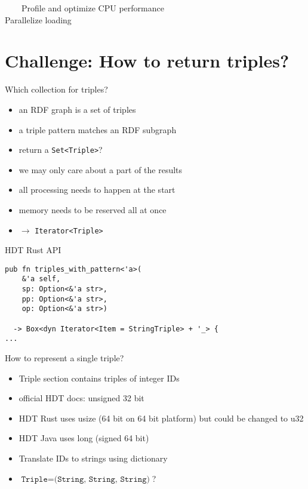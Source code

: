 \documentclass[14pt,aspectratio=169]{beamer}
\newcommand{\imageslide}[4][]
{
\begin{frame}[plain]{~~~~#2}
\vspace{0.2em}
\centering\makebox[\linewidth]{\texttt{[image: \#3]}}
\\#1
\note{#4}
\end{frame}
}
\newcommand\con{\item[$-$]}
\begin{document}
\imageslide[Parallelize loading]{Profile and optimize CPU performance}{img/parallel.png}{}

\section{Challenge: How to return triples?}

\begin{frame}{Which collection for triples?}
\begin{itemize}
\item an RDF graph is a set of triples
\item a triple pattern matches an RDF subgraph
\item return a \texttt{Set<Triple>}?
\pause
\con we may only care about a part of the results
\con all processing needs to happen at the start
\con memory needs to be reserved all at once
\item $\rightarrow$ \texttt{Iterator<Triple>}
\end{itemize}
\end{frame}

\begin{frame}[fragile]{HDT Rust API}
\small
\begin{verbatim}
pub fn triples_with_pattern<'a>(
    &'a self,
    sp: Option<&'a str>,
    pp: Option<&'a str>,
    op: Option<&'a str>)

  -> Box<dyn Iterator<Item = StringTriple> + '_> {
...
\end{verbatim}
\end{frame}

\begin{frame}{How to represent a single triple?}
\centering
{}\\
\begin{itemize}
\item Triple section contains triples of integer IDs
\item official HDT docs: unsigned 32 bit
\item HDT Rust uses usize (64 bit on 64 bit platform) but could be changed to u32
\item HDT Java uses long (signed 64 bit)
\item Translate IDs to strings using dictionary
\item $\texttt{Triple} = \texttt{(String, String, String)}$?
\end{itemize}
\end{frame}
\end{document}
